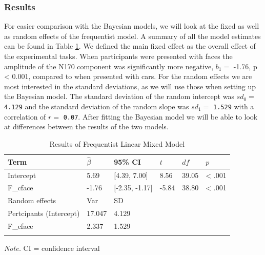 \documentclass[
  doc,12pt,floatsintext]{apa7}
\begin{document}
\subsubsection{Results}\label{results}

For easier comparison with the Bayesian models, we will look at the fixed as well as random effects of the frequentist model. A summary of all the model estimates can be found in Table \ref{tab:fLMM-table}. We defined the main fixed effect as the overall effect of the experimental tasks. When participants were presented with faces the amplitude of the N170 component was significantly more negative, \(b_1 =\) -1.76, p \textless{} 0.001, compared to when presented with cars. For the random effects we are most interested in the standard deviations, as we will use those when setting up the Bayesian model. The standard deviation of the random intercept was \(sd_0 =\) \texttt{4.129} and the standard deviation of the random slope was \(sd_1 =\) \texttt{1.529} with a correlation of \(r =\) \texttt{0.07}. After fitting the Bayesian model we will be able to look at differences between the results of the two models.

\begin{table}[tbp]

\begin{center}
\begin{threeparttable}

\caption{\label{tab:fLMM-table}Results of Frequentist Linear Mixed Model}

\begin{tabular}{llllll}
\toprule
Term & $\hat{\beta}$ & 95\% CI & $t$ & $\mathit{df}$ & $p$\\
\midrule
Intercept & 5.69 & {}[4.39, 7.00] & 8.56 & 39.05 & < .001\\
F\_cface & -1.76 & {}[-2.35, -1.17] & -5.84 & 38.80 & < .001\\
Random effects & Var & SD & & & \\
Pertcipants (Intercept) & 17.047 & 4.129 & & & \\
F\_cface & 2.337 & 1.529 & & & \\
\bottomrule
\addlinespace
\end{tabular}

\begin{tablenotes}[para]
\normalsize{\textit{Note.} CI = confidence interval}
\end{tablenotes}

\end{threeparttable}
\end{center}

\end{table}
\end{document}
